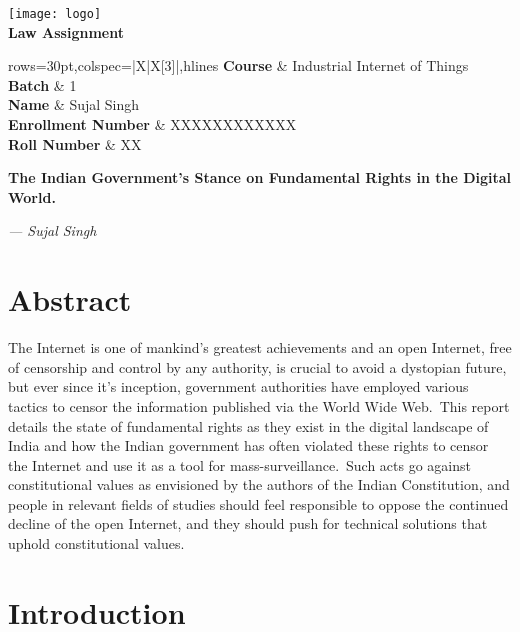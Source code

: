 \documentclass[11pt,a4paper,oneside]{scrarticle}
\renewcommand*{\maketitle}{
    \pagenumbering{gobble}
    \begin{center}
        \vspace*{8em}
        \texttt{[image: logo]} \\[40pt]
        \textbf{\Huge Law Assignment} \\[40pt]
        \begin{table}[htb]
            \label{tab:name-slip}
            \begin{tblr}{rows={30pt},colspec={|X|X[3]|},hlines}
                \textbf{Course}            & Industrial Internet of Things \\
                \textbf{Batch}             & 1                             \\
                \textbf{Name}              & Sujal Singh                   \\
                \textbf{Enrollment Number} & XXXXXXXXXXXX                  \\
                \textbf{Roll Number}       & XX                            \\
            \end{tblr}
        \end{table}
    \end{center}
    \newpage
    \pagenumbering{arabic}
}
\begin{document}
    \maketitle

    \begin{center}
        \textbf{\LARGE The Indian Government's Stance on Fundamental Rights in the Digital World.}
        \\[10pt]
    \end{center}
    \begin{flushright}
        \textit{--- Sujal Singh} \\[20pt]
    \end{flushright}


    \section*{Abstract}\label{sec:abstract}
    The Internet is one of mankind's greatest achievements and an open Internet, free of censorship and control by any
    authority, is crucial to avoid a dystopian future, but ever since it's inception, government authorities have
    employed various tactics to censor the information published via the World Wide Web.\ This report details the
    state of fundamental rights as they exist in the digital landscape of India and how the Indian government has often
    violated these rights to censor the Internet and use it as a tool for mass-surveillance.\ Such acts go against
    constitutional values as envisioned by the authors of the Indian Constitution, and people in relevant fields of
    studies should feel responsible to oppose the continued decline of the open Internet, and they should push for
    technical solutions that uphold constitutional values.




    \section{Introduction}\label{sec:introduction}
\end{document}
